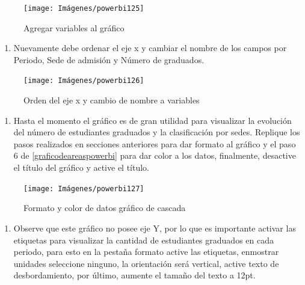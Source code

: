 \documentclass[
]{book}
\providecommand{\tightlist}{%
  \setlength{\itemsep}{0pt}\setlength{\parskip}{0pt}}
\begin{document}
\begin{figure}

{\centering \texttt{[image: Imágenes/powerbi125]} 

}

\caption{Agregar variables al gráfico}\label{fig:paso2graficobarradeherramientas-fig}
\end{figure}

\begin{enumerate}
\def\labelenumi{\arabic{enumi}.}
\setcounter{enumi}{2}
\tightlist
\item
  Nuevamente debe ordenar el eje x y cambiar el nombre de los campos por Periodo, Sede de admisión y Número de graduados.
\end{enumerate}

\begin{figure}

{\centering \texttt{[image: Imágenes/powerbi126]} 

}

\caption{Orden del eje x y cambio de nombre a variables}\label{fig:paso3graficobarradeherramientas-fig}
\end{figure}

\begin{enumerate}
\def\labelenumi{\arabic{enumi}.}
\setcounter{enumi}{3}
\tightlist
\item
  Hasta el momento el gráfico es de gran utilidad para visualizar la evolución del número de estudiantes graduados y la clasificación por sedes. Replique los pasos realizados en secciones anteriores para dar formato al gráfico y el paso 6 de \ref{graficodeareaspowerbi} para dar color a los datos, finalmente, desactive el título del gráfico y active el título.
\end{enumerate}

\begin{figure}

{\centering \texttt{[image: Imágenes/powerbi127]} 

}

\caption{Formato y color de datos gráfico de cascada}\label{fig:paso4graficobarradeherramientas-fig}
\end{figure}

\begin{enumerate}
\def\labelenumi{\arabic{enumi}.}
\setcounter{enumi}{4}
\tightlist
\item
  Observe que este gráfico no posee eje Y, por lo que es importante activar las etiquetas para visualizar la cantidad de estudiantes graduados en cada periodo, para esto en la pestaña formato active las etiquetas, enmostrar unidades seleccione ninguno, la orientación será vertical, active texto de desbordamiento, por último, aumente el tamaño del texto a 12pt.
\end{enumerate}
\end{document}
